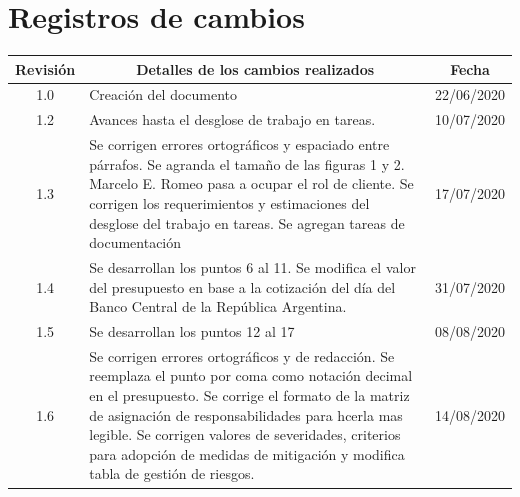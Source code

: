 \documentclass[11pt]{charter}
\begin{document}
\maketitle
\thispagestyle{empty}
\pagebreak


\thispagestyle{empty}
{\setlength{\parskip}{0pt}
\tableofcontents{}
}
\pagebreak


\section{Registros de cambios}
\label{sec:registro}


\begin{table}[ht]
\label{tab:registro}
\centering

\begin{tabularx}{\linewidth}{@{}|c|X|c|@{}}
\hline
\rowcolor[HTML]{C0C0C0} 
Revisión & \multicolumn{1}{c|}{\cellcolor[HTML]{C0C0C0}Detalles de los cambios realizados} & Fecha      \\ \hline
1.0      & Creación del documento                                                          & 22/06/2020 \\ \hline
1.2      & Avances hasta el desglose de trabajo en tareas.                                 & 10/07/2020 \\ \hline
1.3      & Se corrigen errores ortográficos y espaciado entre párrafos. \newline
	Se agranda el tamaño de las figuras 1 y 2.\newline
	Marcelo E. Romeo pasa a ocupar el rol de cliente.\newline
	Se corrigen los requerimientos y estimaciones del desglose del trabajo en tareas.\newline
	Se agregan tareas de documentación
& 17/07/2020 \\ \hline

1.4      & Se desarrollan los puntos 6 al 11.\newline
	Se modifica el valor del presupuesto en base a la cotización del día del Banco Central de la República Argentina.\newline
& 31/07/2020 \\ \hline
1.5      & Se desarrollan los puntos 12 al 17                                                  & 08/08/2020 \\ \hline
1.6      & Se corrigen errores ortográficos y de redacción. \newline
	Se reemplaza el punto por coma como notación decimal en el presupuesto.\newline
	Se corrige el formato de la matriz de asignación de responsabilidades para hcerla mas legible.\newline
	Se corrigen valores de severidades, criterios para adopción de medidas de mitigación y modifica tabla de gestión de riesgos.& 14/08/2020 \\ \hline
\end{tabularx}
\end{table}
\end{document}
